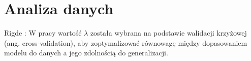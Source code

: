 \chapter{Analiza danych}
\label{ch:analiza}

Rigde : W pracy wartość \( \lambda \) została wybrana na podstawie walidacji krzyżowej (ang. cross-validation), aby zoptymalizować równowagę między dopasowaniem modelu do danych a jego zdolnością do generalizacji.